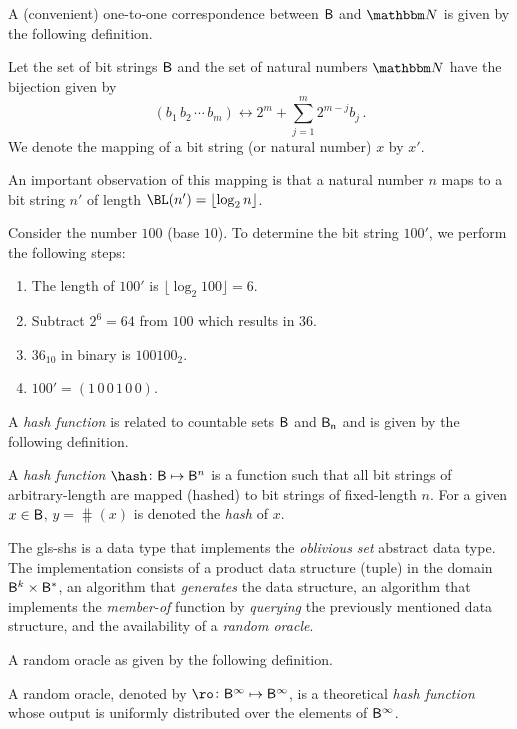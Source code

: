 \documentclass[ ../main.tex]{subfiles}
\begin{document}
A (convenient) one-to-one correspondence between $\Set{B}$ and $\NatSet$ is given by the following definition.
\begin{definition}
\label{def:mapping}
Let the set of bit strings $\Set{B}$ and the set of natural numbers $\NatSet$ have the bijection given by
\begin{equation}
    (b_1 \, b_2 \, \cdots \, b_m) \longleftrightarrow 2^m + \sum_{j=1}^{m} 2^{m - j} b_j\,.
\end{equation}
We denote the mapping of a bit string (or natural number) $x$ by $x'$.
\end{definition}
An important observation of this mapping is that a natural number $n$ maps to a bit string $n'$ of length $\BL(n') = \lfloor \log_2 n \rfloor$.
\begin{example}
Consider the number $100$ (base $10$). To determine the bit string $100'$, we perform the following steps:
\begin{enumerate}
    \item The length of $100'$ is $\lfloor \log_2 100 \rfloor = 6$.
    \item Subtract $2^6 = 64$ from $100$ which results in $36$.
    \item $36_{10}$ in binary is $100100_2$.
    \item $100' = (1\,0\,0\,1\,0\,0)$.
\end{enumerate}
\end{example}

A \emph{hash function} is related to countable sets $\Set{B}$ and $\Set{B}[n]$ and is given by the following definition.
\begin{definition}
A \emph{hash function} $\hash \colon \Set{B} \mapsto \Set{B}^n$ is a function such that all bit strings of arbitrary-length are mapped (hashed) to bit strings of fixed-length $n$. For a given $x \in \Set{B}$, $y = \hash(x)$ is denoted the \emph{hash} of $x$.
\end{definition}

The \gls{gls-shs} is a data type that implements the \emph{oblivious set} abstract data type. The implementation consists of a product data structure (tuple) in the domain $\Set{B}^k \times \Set{B}^{*}$, an algorithm that \emph{generates} the data structure, an algorithm that implements the \emph{member-of} function by \emph{querying} the previously mentioned data structure, and the availability of a \emph{random oracle}.

A random oracle as given by the following definition.
\begin{definition}
\label{def:randomoracle}
A random oracle, denoted by $\ro \colon \Set{B}^\infty \mapsto \Set{B}^\infty$, is a theoretical \emph{hash function} whose output is uniformly distributed over the elements of $\Set{B}^\infty$.
\end{definition}
\end{document}
